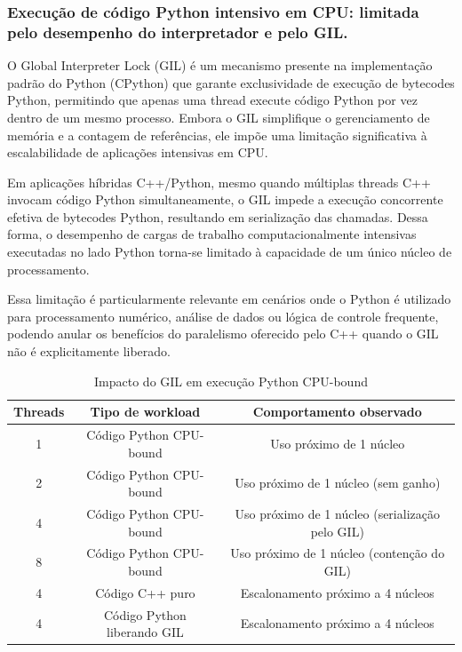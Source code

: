     \subsubsection{Execução de código Python intensivo em CPU: limitada pelo desempenho do interpretador e pelo GIL.}
O Global Interpreter Lock (GIL) é um mecanismo presente na implementação padrão do Python (CPython) que garante exclusividade de execução de bytecodes Python, permitindo que apenas uma thread execute código Python por vez dentro de um mesmo processo. Embora o GIL simplifique o gerenciamento de memória e a contagem de referências, ele impõe uma limitação significativa à escalabilidade de aplicações intensivas em CPU.

Em aplicações híbridas C++/Python, mesmo quando múltiplas threads C++ invocam código Python simultaneamente, o GIL impede a execução concorrente efetiva de bytecodes Python, resultando em serialização das chamadas. Dessa forma, o desempenho de cargas de trabalho computacionalmente intensivas executadas no lado Python torna-se limitado à capacidade de um único núcleo de processamento.

Essa limitação é particularmente relevante em cenários onde o Python é utilizado para processamento numérico, análise de dados ou lógica de controle frequente, podendo anular os benefícios do paralelismo oferecido pelo C++ quando o GIL não é explicitamente liberado.

\begin{table}[h]
\centering
\caption{Impacto do GIL em execução Python CPU-bound}
\begin{tabular}{|c|c|c|}
\hline
\textbf{Threads} & \textbf{Tipo de workload} & \textbf{Comportamento observado} \\
\hline
1 & Código Python CPU-bound & Uso próximo de 1 núcleo \\
\hline
2 & Código Python CPU-bound & Uso próximo de 1 núcleo (sem ganho) \\
\hline
4 & Código Python CPU-bound & Uso próximo de 1 núcleo (serialização pelo GIL) \\
\hline
8 & Código Python CPU-bound & Uso próximo de 1 núcleo (contenção do GIL) \\
\hline
4 & Código C++ puro & Escalonamento próximo a 4 núcleos \\
\hline
4 & Código Python liberando GIL & Escalonamento próximo a 4 núcleos \\
\hline
\end{tabular}
\end{table}

